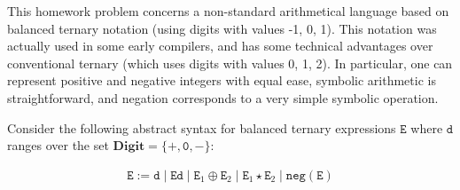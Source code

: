 \documentclass[a4paper,10pt]{article}
\newcommand{\E}{\mathtt{E}}
\newcommand{\digit}{\mathtt{d}}
\newcommand{\negation}{\mathtt{neg}}
\newcommand{\Digit}{\mathbf{Digit}}
\newcommand{\question}[1]
{\color{DarkBlue}#1 \color{Black} \newline}
\begin{document}
\question{
This homework problem concerns a non-standard arithmetical language based on balanced 
ternary notation (using digits with values -1, 0, 1). This notation was actually used in some early compilers,
and has some technical advantages over conventional ternary (which uses 
digits with values 0, 1, 2). In particular, one can represent positive and negative 
integers with equal ease, symbolic arithmetic is straightforward, and negation 
corresponds to a very simple symbolic operation.

Consider the following abstract syntax for balanced ternary expressions $\E$ 
where $\digit$ ranges over the set $\Digit = \{\mathtt{+},\mathtt{0},\mathtt{-}\}$:

\begin{align*}
\E := \digit \; | \; \E \digit \; | \; \E_1 \oplus \E_2 \; | \; \E_1 \star \E_2 \; | \; \negation(\E)
\end{align*}
}
\end{document}
